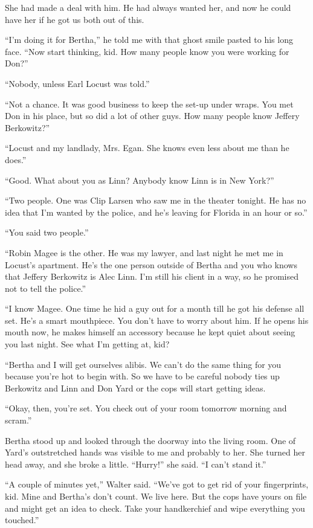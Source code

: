 \documentclass{novel}
\begin{document}
She had made a deal with him. He had always wanted her, and now he could have her if he got us both out of this.

“I’m doing it for Bertha,” he told me with that ghost smile pasted to his long face. “Now start thinking, kid. How many people know you were working for Don?”

“Nobody, unless Earl Locust was told.”

“Not a chance. It was good business to keep the set-up under wraps. You met Don in his place, but so did a lot of other guys. How many people know Jeffery Berkowitz?”

“Locust and my landlady, Mrs. Egan. She knows even less about me than he does.”

“Good. What about you as Linn? Anybody know Linn is in New York?”

“Two people. One was Clip Larsen who saw me in the theater tonight. He has no idea that I’m wanted by the police, and he’s leaving for Florida in an hour or so.”

“You said two people.”

“Robin Magee is the other. He was my lawyer, and last night he met me in Locust’s apartment. He’s the one person outside of Bertha and you who knows that Jeffery Berkowitz is Alec Linn. I’m still his client in a way, so he promised not to tell the police.”

“I know Magee. One time he hid a guy out for a month till he got his defense all set. He’s a smart mouthpiece. You don’t have to worry about him. If he opens his mouth now, he makes himself an accessory because he kept quiet about seeing you last night. See what I’m getting at, kid? 

“Bertha and I will get ourselves alibis. We can’t do the same thing for you because you’re hot to begin with. So we have to be careful nobody ties up Berkowitz and Linn and Don Yard or the cops will start getting ideas. 

“Okay, then, you’re set. You check out of your room tomorrow morning and scram.”

\scenestars

Bertha stood up and looked through the doorway into the living room. One of Yard’s outstretched hands was visible to me and probably to her. She turned her head away, and she broke a little. “Hurry!” she said. “I can’t stand it.”

“A couple of minutes yet,” Walter said. “We’ve got to get rid of your fingerprints, kid. Mine and Bertha’s don’t count. We live here. But the cops have yours on file and might get an idea to check. Take your handkerchief and wipe everything you touched.”
\end{document}
